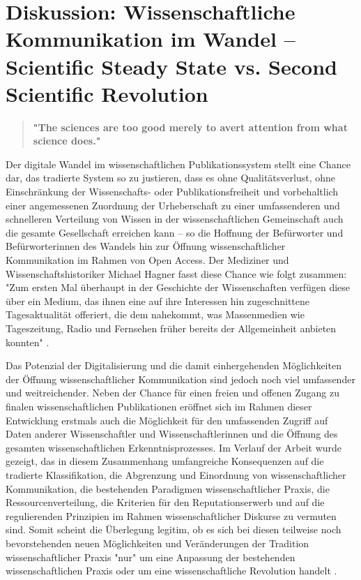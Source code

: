 \chapter{Diskussion: Wissenschaftliche Kommunikation im Wandel – Scientific Steady State vs. Second Scientific Revolution}

\begin{quote}
\textbf{"The sciences are too good merely to avert attention from what science does."}
\end{quote} \cite{Kittler_2004}

Der digitale Wandel im wissenschaftlichen Publikationssystem stellt eine Chance dar, das tradierte System so zu justieren, dass es ohne Qualitätsverlust, ohne Einschränkung der Wissenschafts- oder Publikationsfreiheit und vorbehaltlich einer angemessenen Zuordnung der Urheberschaft zu einer umfassenderen und schnelleren Verteilung von Wissen in der wissenschaftlichen Gemeinschaft auch die gesamte Gesellschaft erreichen kann – so die Hoffnung der Befürworter und Befürworterinnen des Wandels hin zur Öffnung wissenschaftlicher Kommunikation im Rahmen von Open Access. Der Mediziner und Wissenschaftshistoriker Michael Hagner fasst diese Chance wie folgt zusammen: "Zum ersten Mal überhaupt in der Geschichte der Wissenschaften verfügen diese über ein Medium, das ihnen eine auf ihre Interessen hin zugeschnittene Tagesaktualität offeriert, die dem nahekommt, was Massenmedien wie Tageszeitung, Radio und Fernsehen früher bereits der Allgemeinheit anbieten konnten" \cite[:50]{Hagner_2015}.

Das Potenzial der Digitalisierung und die damit einhergehenden Möglichkeiten der Öffnung wissenschaftlicher Kommunikation sind jedoch noch viel umfassender und weitreichender. Neben der Chance für einen freien und offenen Zugang zu finalen wissenschaftlichen Publikationen eröffnet sich im Rahmen dieser Entwicklung erstmals auch die Möglichkeit für den umfassenden Zugriff auf Daten anderer Wissenschaftler und Wissenschaftlerinnen und die Öffnung des gesamten wissenschaftlichen Erkenntnisprozesses. Im Verlauf der Arbeit wurde gezeigt, das in diesem Zusammenhang umfangreiche Konsequenzen auf die tradierte Klassifikation, die Abgrenzung und Einordnung von wissenschaftlicher Kommunikation, die bestehenden Paradigmen wissenschaftlicher Praxis, die Ressourcenverteilung, die Kriterien für den Reputationserwerb und auf die regulierenden Prinzipien im Rahmen wissenschaftlicher Diskurse zu vermuten sind. Somit scheint die Überlegung legitim, ob es sich bei diesen teilweise noch bevorstehenden neuen Möglichkeiten und Veränderungen der Tradition wissenschaftlicher Praxis "nur" um eine Anpassung der bestehenden wissenschaftlichen Praxis oder um eine wissenschaftliche Revolution handelt \cite{Kuhn_2012}.

